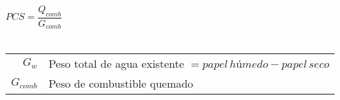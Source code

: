 \documentclass[11pt,a4paper]{article}
\begin{document}
\begin{cajita}
\begin{multicols}{2}
			$PCS = \dfrac{Q_{comb}}{G_{comb}}$\\[.1cm]
			
			
			\\[.1cm]
			\vspace{.3cm}
		
			
			\begin{tabular}{r p{.7\linewidth}}
				$G_w$ & Peso total de agua existente $= papel\,húmedo - papel\, seco$\\
				$G_{comb}$ & Peso de combustible quemado\\
			\end{tabular}
		\end{multicols}
		
	\end{cajita}
	
\end{document}
